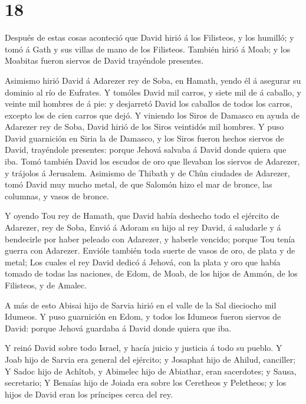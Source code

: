 \hypertarget{section-17}{%
\section{18}\label{section-17}}

 Después de estas cosas aconteció que David hirió á los
Filisteos, y los humilló; y tomó á Gath y sus villas de mano de los
Filisteos.  También hirió á Moab; y los Moabitas fueron
siervos de David trayéndole presentes.

 Asimismo hirió David á Adarezer rey de Soba, en Hamath,
yendo él á asegurar su dominio al río de Eufrates.  Y
tomóles David mil carros, y siete mil de á caballo, y veinte mil hombres
de á pie: y desjarretó David los caballos de todos los carros, excepto
los de cien carros que dejó.  Y viniendo los Siros de
Damasco en ayuda de Adarezer rey de Soba, David hirió de los Siros
veintidós mil hombres.  Y puso David guarnición en Siria la
de Damasco, y los Siros fueron hechos siervos de David, trayéndole
presentes: porque Jehová salvaba á David donde quiera que iba.
 Tomó también David los escudos de oro que llevaban los
siervos de Adarezer, y trájolos á Jerusalem.  Asimismo de
Thibath y de Chûn ciudades de Adarezer, tomó David muy mucho metal, de
que Salomón hizo el mar de bronce, las columnas, y vasos de bronce.

 Y oyendo Tou rey de Hamath, que David había deshecho todo
el ejército de Adarezer, rey de Soba,  Envió á Adoram su
hijo al rey David, á saludarle y á bendecirle por haber peleado con
Adarezer, y haberle vencido; porque Tou tenía guerra con Adarezer.
Envióle también toda suerte de vasos de oro, de plata y de metal;
 Los cuales el rey David dedicó á Jehová, con la plata y
oro que había tomado de todas las naciones, de Edom, de Moab, de los
hijos de Ammón, de los Filisteos, y de Amalec.

 A más de esto Abisai hijo de Sarvia hirió en el valle de
la Sal dieciocho mil Idumeos.  Y puso guarnición en Edom, y
todos los Idumeos fueron siervos de David: porque Jehová guardaba á
David donde quiera que iba.

 Y reinó David sobre todo Israel, y hacía juicio y justicia
á todo su pueblo.  Y Joab hijo de Sarvia era general del
ejército; y Josaphat hijo de Ahilud, canciller;  Y Sadoc
hijo de Achîtob, y Abimelec hijo de Abiathar, eran sacerdotes; y Sausa,
secretario;  Y Benaías hijo de Joiada era sobre los
Ceretheos y Peletheos; y los hijos de David eran los príncipes cerca del
rey.

